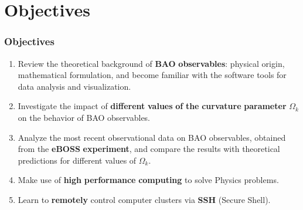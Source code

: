 \documentclass{beamer}
\newcounter{cont}
\begin{document}
\section{Objectives}
\begin{frame}[allowframebreaks]
\frametitle{Objectives}
\begin{enumerate}
  \item Review the theoretical background of \textbf{BAO} \textbf{observables}: physical origin, mathematical formulation, and become familiar with the software tools for data analysis and visualization.
  \item Investigate the impact of \textbf{different} \textbf{values} \textbf{of} \textbf{the} \textbf{curvature} \textbf{parameter} $\Omega_k$ on the behavior of BAO observables.
  \item Analyze the most recent observational data on BAO observables, obtained from the \textbf{eBOSS} \textbf{experiment}, and compare the results with theoretical predictions for different values of $\Omega_k$.
	\item Make use of \textbf{high} \textbf{performance} \textbf{computing} to solve Physics problems.
  \item Learn to \textbf{remotely} control computer clusters via \textbf{SSH} (Secure Shell).
\end{enumerate}
\end{frame}
\end{document}

